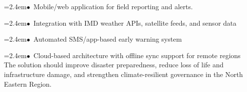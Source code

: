 \documentclass[10pt,a4paper]{article}
\begin{document}
\begin{tcolorbox}[pscard, title={"\textbf{SIH26001} \quad $\vert$ \quad AI-Based early warning and landslide Risk Monitoring System in NER}]
\noindent\hspace*{1.2em}\hangindent=2.4em\textcolor{sihblue}{$\bullet$}~\small Mobile/web application for field reporting and alerts.\par\vspace{0.05cm}
\noindent\hspace*{1.2em}\hangindent=2.4em\textcolor{sihblue}{$\bullet$}~\small Integration with IMD weather APIs, satellite feeds, and sensor data\par\vspace{0.05cm}
\noindent\hspace*{1.2em}\hangindent=2.4em\textcolor{sihblue}{$\bullet$}~\small Automated SMS/app-based early warning system\par\vspace{0.05cm}
\noindent\hspace*{1.2em}\hangindent=2.4em\textcolor{sihblue}{$\bullet$}~\small Cloud-based architecture with offline sync support for remote regions The solution should improve disaster preparedness, reduce loss of life and infrastructure damage, and strengthen climate-resilient governance in the North Eastern Region.\par\vspace{0.05cm}

\end{tcolorbox}
\vspace{0.4cm}
{}
\end{document}
